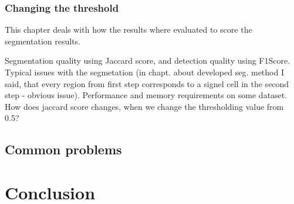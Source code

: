 \documentclass[
  digital,     %
  oneside,     %
  nosansbold,  %
  nocolorbold, %
  lof,         %
  lot,         %
]{fithesis4}
\begin{document}
\subsection{Changing the threshold}



This chapter deals with how the results where evaluated to score the
segmentation results.

Segmentation quality using Jaccard score, and detection quality using F1Score.
Typical issues with the segmetation (in chapt. about developed seg. method I
said, that every region from first step corresponds to a signel cell in the
second step - obvious issue). Performance and memory requirements on some
dataset. How does jaccard score changes, when we change the thresholding value
from 0.5?

\section{Common problems}

\chapter{Conclusion}
\end{document}
